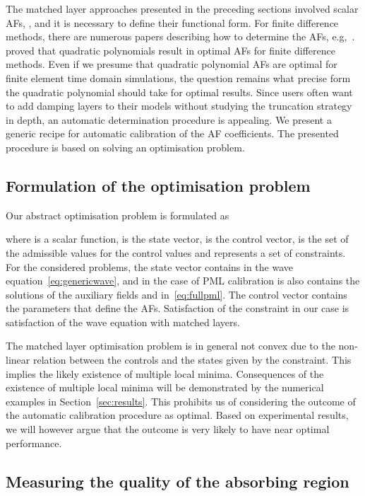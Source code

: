 \documentclass[a4paper]{article}
\begin{document}
The matched layer approaches presented in the preceding sections
involved scalar AFs, , and it is necessary to
define their functional form. For finite difference methods, there are
numerous papers describing how to determine the AFs,
e.g,~\citep{asvadurov03etall, chew96jin,
  collino98monk}. \citet{chew96jin} proved that quadratic polynomials
result in optimal AFs for finite difference methods. Even if we
presume that quadratic polynomial AFs are optimal for finite element
time domain simulations, the question remains what precise form the
quadratic polynomial should take for optimal results. Since users
often want to add damping layers to their models without studying the
truncation strategy in depth, an automatic determination procedure is
appealing. We present a generic recipe for automatic calibration of
the AF coefficients. The presented procedure is based on solving an
optimisation problem.

\subsection{Formulation of the optimisation problem}
\label{sec:opt}

Our abstract optimisation problem is formulated as

where  is a scalar function,  is the state vector,
 is the control vector,  is the
set of the admissible values for the control values and 
represents a set of constraints. For the considered problems, the
state vector  contains  in the wave
equation~\eqref{eq:genericwave}, and in the case of PML calibration is
also contains the solutions of the auxiliary fields  and
 in~\eqref{eq:fullpml}. The control vector  contains
the  parameters that define the AFs. Satisfaction of the
constraint  in our case is satisfaction of
the wave equation with matched layers.

The matched layer optimisation problem is in general not convex due to
the non-linear relation between the controls and the states given by
the constraint. This implies the likely existence of multiple local
minima. Consequences of the existence of multiple local minima will be
demonstrated by the numerical examples in
Section~\ref{sec:results}. This prohibits us of considering the
outcome of the automatic calibration procedure as optimal. Based on
experimental results, we will however argue that the outcome is very
likely to have near optimal performance.

\subsection{Measuring the quality of the absorbing region}
\label{sec:quality}
\end{document}
